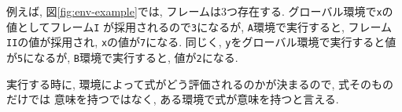 例えば, 図\ref{fig:env-example}では, フレームは3つ存在する.
グローバル環境で\lstinline{x}の値としてフレーム\lstinline{I}
が採用されるので\lstinline{3}になるが, \lstinline{A}環境で実行すると,
フレーム\lstinline{II}の値が採用され, \lstinline{x}の値が\lstinline{7}になる.
同じく, \lstinline{y}をグローバル環境で実行すると値が\lstinline{5}になるが,
\lstinline{B}環境で実行すると, 値が\lstinline{2}になる.

実行する時に, 環境によって式がどう評価されるのかが決まるので, 式そのものだけでは
意味を持つではなく, ある環境で式が意味を持つと言える.
%

%
